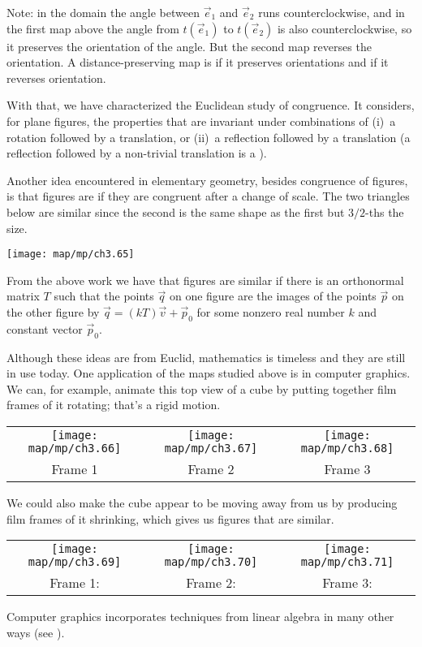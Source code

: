 Note: in the domain  
the angle between $\vec{e}_1$ and $\vec{e}_2$ runs counterclockwise,
and in the first map above the angle from 
$t(\vec{e}_1)$ to $t(\vec{e}_2)$ is also counterclockwise,
so it preserves the orientation of the angle.
But the second map reverses the orientation.
A distance-preserving map is 
 if it 
preserves orientations
and  
if it reverses orientation.

With that, we have characterized the Euclidean study of congruence.
It considers, for plane figures, the properties that are invariant 
under combinations of (i)~a rotation followed by a translation,
or (ii)~a reflection followed by a translation
(a reflection followed by a non-trivial 
translation is a ).

Another idea encountered in 
elementary geometry, besides congruence of figures, is
that figures are 
if they are congruent after a change of scale. 
The two triangles below are similar since the second is 
the same shape as the first but $3/2$-ths the size.
\begin{center}
  \texttt{[image: map/mp/ch3.65]}
\end{center}
From the above work we have that figures are similar if there
is an orthonormal matrix $T$ such that the points $\vec{q}$ 
on one figure are the images of 
the points $\vec{p}$ on the other figure by 
$\vec{q}=(kT)\vec{v}+\vec{p}_0$
for some nonzero real number $k$ and constant vector $\vec{p}_0$.

Although these ideas are from Euclid, mathematics is timeless and
they are still in use today. 
One application of the maps studied above is in computer graphics.
We can, for example, animate this top view of a cube 
by putting together film frames of it rotating; that's a rigid motion. 
\begin{center}
  \begin{tabular}{ccc}
    \texttt{[image: map/mp/ch3.66]}
    &\texttt{[image: map/mp/ch3.67]}
    &\texttt{[image: map/mp/ch3.68]}                       \\
    Frame 1      &Frame 2       &Frame 3       
  \end{tabular}
\end{center}
We could also make the cube appear to be moving away from us by producing film
frames of it shrinking, which gives us figures that are similar.
\begin{center}
  \begin{tabular}{ccc}
    \texttt{[image: map/mp/ch3.69]}
    &\texttt{[image: map/mp/ch3.70]}
    &\texttt{[image: map/mp/ch3.71]}                       \\
    Frame 1:        &Frame 2:       &Frame 3:        
  \end{tabular}
\end{center}
Computer graphics incorporates techniques
from linear algebra in many other ways (see ).


